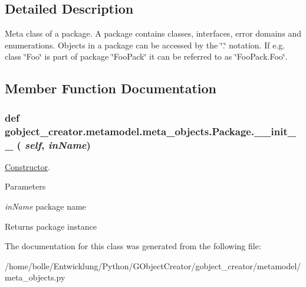 \subsection{Detailed Description}
Meta class of a package. A package contains classes, interfaces, error domains and enumerations. Objects in a package can be accessed by the \char`\"{}.\char`\"{} notation. If e.g. class \char`\"{}Foo\char`\"{} is part of package \char`\"{}FooPack\char`\"{} it can be referred to as \char`\"{}FooPack.Foo\char`\"{}. 

\subsection{Member Function Documentation}
\hypertarget{classgobject__creator_1_1metamodel_1_1meta__objects_1_1Package_af5a888420d4558a79a74036109ac352f}{
\subsubsection[{\_\-\_\-init\_\-\_\-}]{\setlength{\rightskip}{0pt plus 5cm}def gobject\_\-creator.metamodel.meta\_\-objects.Package.\_\-\_\-init\_\-\_\- ( {\em self}, \/   {\em inName})}}
\label{classgobject__creator_1_1metamodel_1_1meta__objects_1_1Package_af5a888420d4558a79a74036109ac352f}


\hyperlink{classgobject__creator_1_1metamodel_1_1meta__objects_1_1Constructor}{Constructor}. 


\begin{DoxyParams}{Parameters}
\item[{\em inName}]package name \end{DoxyParams}
\begin{DoxyReturn}{Returns}
package instance 
\end{DoxyReturn}


The documentation for this class was generated from the following file:\begin{DoxyCompactItemize}
\item 
/home/bolle/Entwicklung/Python/GObjectCreator/gobject\_\-creator/metamodel/meta\_\-objects.py\end{DoxyCompactItemize}
